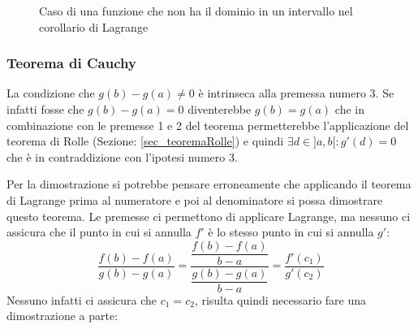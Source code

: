 \begin{figure}[h]
\centering
{}
	\caption{Caso di una funzione che non ha il dominio in un intervallo nel 
    corollario di Lagrange}
	\label{fig_esempioCorollarioLagrange}
\end{figure}


\subsubsection{Teorema di Cauchy} \label{sec_teoremaCauchy}
\thm {
Date due funzioni $f,g:[a,b] \to \mathbb{R}$ con le seguenti proprietà:
\begin{enumerate}
    \item $f,g$ è continue su $[a,b]$
    \item $f,g$ è derivabili su $]a,b[$
    \item $g'(x) \neq 0 \quad \forall x\in ]a,b[$
\end{enumerate}
Allora:
\begin{equation*}
    \exists \,c \in ]a,b[ \;: \dfrac{f(b)-f(a)}{g(b)-g(a)} = 
    \dfrac{f'(c)}{g'(c)}
\end{equation*}
}
La condizione che $g(b) - g(a) \neq 0$ è intrinseca alla premessa numero 3. Se 
infatti fosse che $g(b) - g(a) = 0$ diventerebbe $g(b) = g(a)$ che in 
combinazione con le premesse 1 e 2 del teorema permetterebbe l'applicazione 
del teorema di Rolle (Sezione: \ref{sec_teoremaRolle}) e quindi $\exists d \in 
]a,b[ : g'(d) = 0$ che è in contraddizione con l'ipotesi numero 3.

Per la dimostrazione si potrebbe pensare erroneamente che applicando il 
teorema di Lagrange prima al numeratore e poi al denominatore si possa 
dimostrare questo teorema. Le premesse ci permettono di applicare Lagrange, ma 
nessuno ci assicura che il punto in cui si annulla $f'$ è lo stesso punto in 
cui si annulla $g'$:
\begin{equation*}
	\dfrac{f(b) - f(a)}{g(b) - g(a)} = \dfrac{\dfrac{f(b) - f(a)}{b-a}}
    {\dfrac{g(b)-g(a)}{b - a}} = \dfrac{f'(c_1)}{g'(c_2)}
\end{equation*}
Nessuno infatti ci assicura che $c_1 = c_2$, risulta quindi necessario fare una 
dimostrazione a parte:


